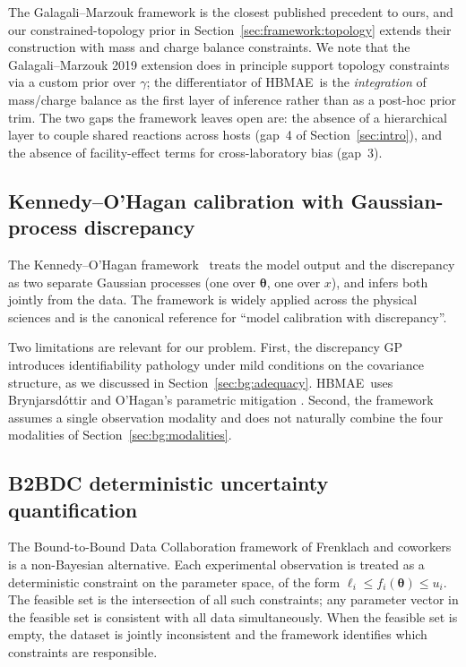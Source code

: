 \documentclass[12pt]{article}
\theoremstyle{plain}
\theoremstyle{definition}
\theoremstyle{remark}
\newcommand{\HBMAE}{HBMAE\xspace}
\begin{document}
The Galagali--Marzouk framework is the closest published precedent to ours,
and our constrained-topology prior in Section~\ref{sec:framework:topology}
extends their construction with mass and charge balance constraints.  We
note that the Galagali--Marzouk 2019 extension does in principle support
topology constraints via a custom prior over $\gamma$; the differentiator
of \HBMAE\ is the \emph{integration} of mass/charge balance as the
first layer of inference rather than as a post-hoc prior trim.  The two
gaps the framework leaves open are: the absence of a hierarchical layer to
couple shared reactions across hosts (gap~4 of
Section~\ref{sec:intro}), and the absence of facility-effect terms for
cross-laboratory bias (gap~3).

\subsection{Kennedy--O'Hagan calibration with Gaussian-process discrepancy}\label{sec:sota:ko}

The Kennedy--O'Hagan framework~\citep{KennedyOHagan2001} treats the model
output and the discrepancy as two separate Gaussian processes (one over
$\boldsymbol{\theta}$, one over $x$), and infers both jointly from the data.
The framework is widely applied across the physical sciences and is the
canonical reference for ``model calibration with discrepancy''.

Two limitations are relevant for our problem.  First, the discrepancy GP
introduces identifiability pathology under mild conditions on the
covariance structure, as we discussed in Section~\ref{sec:bg:adequacy}.
\HBMAE\ uses Brynjarsd\'ottir and O'Hagan's parametric mitigation
\citep{Brynjarsdottir2014}.  Second, the framework assumes a single
observation modality and does not naturally combine the four modalities of
Section~\ref{sec:bg:modalities}.

\subsection{B2BDC deterministic uncertainty quantification}\label{sec:sota:b2bdc}

The Bound-to-Bound Data Collaboration framework of Frenklach and
coworkers~\citep{Frenklach2007,Hegde2018,Oreluk2021} is a non-Bayesian
alternative.  Each experimental observation is treated as a deterministic
constraint on the parameter space, of the form
$\ell_i \le f_i(\boldsymbol\theta) \le u_i$.  The feasible set is the
intersection of all such constraints; any parameter vector in the feasible
set is consistent with all data simultaneously.  When the feasible set is
empty, the dataset is jointly inconsistent and the framework identifies
which constraints are responsible.
\end{document}
